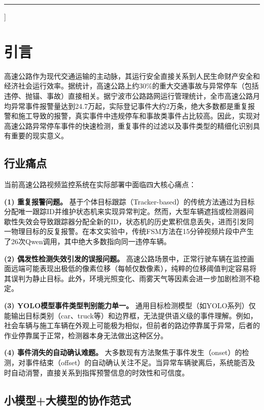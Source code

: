 \documentclass[10.5pt,a4paper,twoside,twocolumn]{ctexart}
\begin{document}
\vfill

\noindent\rule{\textwidth}{0.4pt}
]

\clearpage

\section{\heiti{} 引言}

高速公路作为现代交通运输的主动脉，其运行安全直接关系到人民生命财产安全和经济社会运行效率\cite{parsa2019}。据统计，高速公路上约30\%的重大交通事故与异常停车（包括违停、抛锚、事故）直接相关\cite{wang2020}。据宁波市公路路网运行管理统计，全市高速公路月均异常事件报警量达到24.7万起，实际登记事件大约2万条，绝大多数都是重复报警和施工导致的报警，真实事件中违规停车和事故类事件占比较高\cite{highway2026}。因此，实现对高速公路异常停车事件的快速检测，重复事件的过滤以及事件类型的精细化识别具有重要的现实意义。

\subsection{行业痛点}

当前高速公路视频监控系统在实际部署中面临四大核心痛点：

\textbf{(1) 重复报警问题。} 基于个体目标跟踪（Tracker-based）的传统方法通过为目标分配唯一跟踪ID并维护状态机来实现异常判定\cite{wojke2017}。然而，大型车辆遮挡或检测器间歇性失效会导致跟踪器分配全新的ID，状态机的历史累积信息丢失，进而引发同一物理目标的反复报警。在本文实验中，传统FSM方法在15分钟视频片段中产生了26次Qwen调用，其中绝大多数指向同一违停车辆。

\textbf{(2) 偶发性检测失效引发的误报问题。} 高速公路场景中，正常行驶车辆在监控画面远端可能表现出极低的像素位移（每帧仅数像素），纯粹的位移阈值判定容易将其误判为静止目标。此外，环境光照变化、雨雾天气等因素会进一步加剧检测不稳定。

\textbf{(3) YOLO模型事件类型判别能力单一。} 通用目标检测模型（如YOLO系列）仅能输出目标类别（car、truck等）和边界框，无法提供语义级的事件理解。例如，社会车辆与施工车辆在外观上可能极为相似，但前者的路边停靠属于异常，后者的作业停靠属于正常，检测器本身无法做出这种区分。

\textbf{(4) 事件消失的自动确认难题。} 大多数现有方法聚焦于事件发生（onset）的检测，对事件结束（offset）的自动确认关注不足。当异常车辆驶离后，系统能否及时自动消警，直接关系到指挥预警信息的时效性和可信度。

\subsection{小模型+大模型的协作范式}
\end{document}
